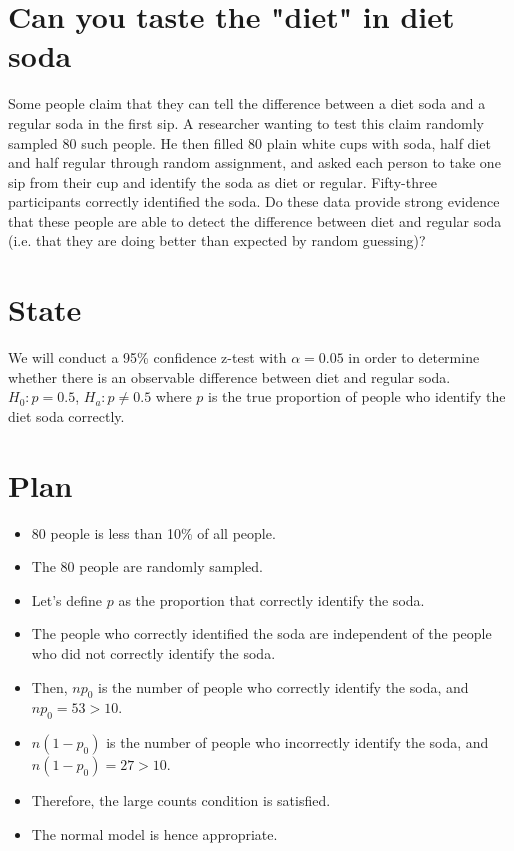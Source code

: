 \documentclass{scrreprt} %
\begin{document}
\section{Can you taste the "diet" in diet soda}

Some people claim that they can tell the difference between a diet soda and a regular soda in the
first sip. A researcher wanting to test this claim randomly sampled 80 such people. He then filled
80 plain white cups with soda, half diet and half regular through random assignment, and asked
each person to take one sip from their cup and identify the soda as diet or regular. Fifty-three
participants correctly identified the soda. Do these data provide strong evidence that these people
are able to detect the difference between diet and regular soda (i.e. that they are doing better
than expected by random guessing)?

\newpage

\section{State}

We will conduct a 95\% confidence z-test with $\alpha = 0.05$ in order to determine whether there
is an observable difference between diet and regular soda. $H_0: p = 0.5$, $H_a: p \neq 0.5$
where $p$ is the true proportion of people who identify the diet soda correctly.

\section{Plan}

\begin{itemize}
	\item 80 people is less than 10\% of all people.
	\item The 80 people are randomly sampled.
	\item Let's define $p$ as the proportion that correctly identify the soda.
	\item The people who correctly identified the soda are independent of
	the people who did not correctly identify the soda.
	\item Then, $np_0$ is the number of people who correctly identify
	the soda, and $np_0 = 53 > 10$.
	\item $n(1-p_0)$ is the number of people who incorrectly identify the
	soda, and $n(1-p_0)= 27 > 10$.
	\item Therefore, the large counts condition is satisfied.
	\item The normal model is hence appropriate.
\end{itemize}
\end{document}
